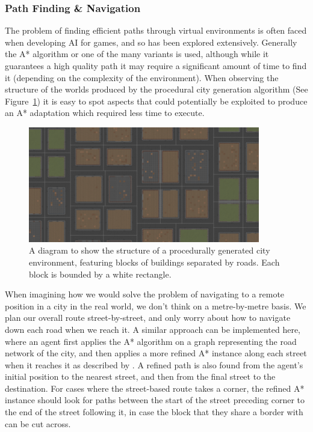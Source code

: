 \documentclass[12pt,a4paper]{article}
\begin{document}
\subsubsection{Path Finding \& Navigation}\noindent
The problem of finding efficient paths through virtual environments is often faced when developing AI for games, and so has been explored extensively. Generally the A* algorithm \cite{bulitko10} or one of the many variants is used, although while it guarantees a high quality path it may require a significant amount of time to find it (depending on the complexity of the environment). When observing the structure of the worlds produced by the procedural city generation algorithm (See Figure~\ref{fig:block}) it is easy to spot aspects that could potentially be exploited to produce an A* adaptation which required less time to execute.

\label{sec:paths}
\begin{figure}[h]
\centering
\includegraphics[width=0.9\textwidth]{blocks}
\caption{A diagram to show the structure of a procedurally generated city environment, featuring blocks of buildings separated by roads. Each block is bounded by a white rectangle.}
\label{fig:block}
\end{figure}

When imagining how we would solve the problem of navigating to a remote position in a city in the real world, we don't think on a metre-by-metre basis. We plan our overall route street-by-street, and only worry about how to navigate down each road when we reach it. A similar approach can be implemented here, where an agent first applies the A* algorithm on a graph representing the road network of the city, and then applies a more refined A* instance along each street when it reaches it as described by  \citeyear{buro05}. A refined path is also found from the agent's initial position to the nearest street, and then from the final street to the destination. For cases where the street-based route takes a corner, the refined A* instance should look for paths between the start of the street preceding corner to the end of the street following it, in case the block that they share a border with can be cut across.
\end{document}
